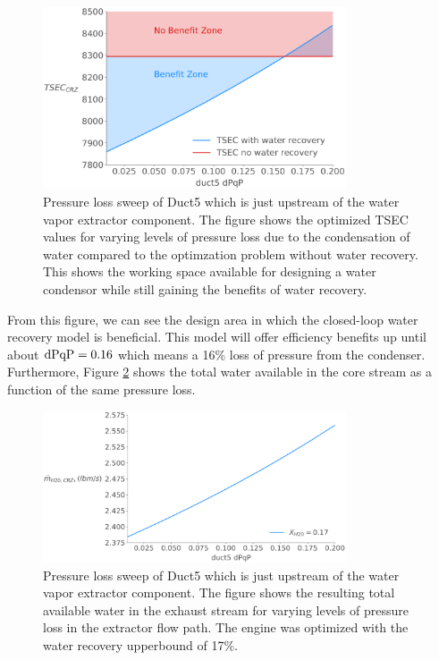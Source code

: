 \documentclass[conf]{new-aiaa}
\begin{document}
\begin{figure}[hbt!]
    \centering
    \includegraphics[width=0.8\textwidth]{N3_dpqp.pdf}
    \caption{Pressure loss sweep of Duct5 which is just upstream of the water vapor extractor component.
        The figure shows the optimized TSEC values for varying levels of pressure loss due to the condensation of water compared to the optimzation problem without water recovery.
        This shows the working space available for designing a water condensor while still gaining the benefits of water recovery.}
    \label{fig:dpqp_sweep}
\end{figure}

From this figure, we can see the design area in which the closed-loop water recovery model is beneficial.
This model will offer efficiency benefits up until about $\rm{dPqP} = 0.16$ which means a 16\% loss of pressure from the condenser.
Furthermore, Figure \ref{fig:dpqp_wdot} shows the total water available in the core stream as a function of the same pressure loss.

\begin{figure}[hbt!]
    \centering
    \includegraphics[width=0.8\textwidth]{N3_wdot.pdf}
    \caption{Pressure loss sweep of Duct5 which is just upstream of the water vapor extractor component.
        The figure shows the resulting total available water in the exhaust stream for varying levels of pressure loss in the extractor flow path.
        The engine was optimized with the water recovery upperbound of 17\%.
    }
    \label{fig:dpqp_wdot}
\end{figure}
\end{document}
